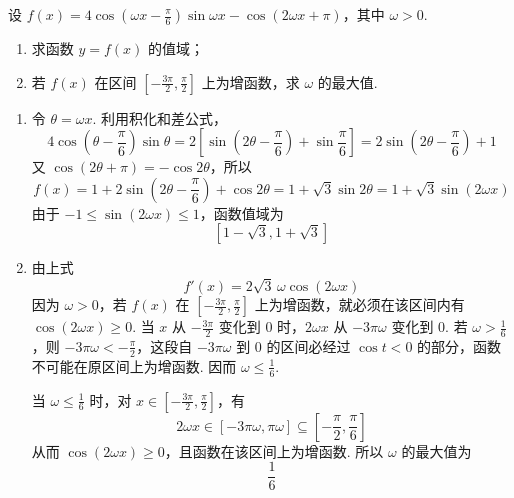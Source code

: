 \begin{problem}
设 \( f(x)=4\cos\left(\omega x-\frac{\pi}{6}\right)\sin\omega x-\cos(2\omega x+\pi) \)，其中 \( \omega>0 \).
\begin{enumerate}
\item 求函数 \( y = f(x) \) 的值域；
\item 若 \( f(x) \) 在区间 \( \left[-\frac{3\pi}{2}, \frac{\pi}{2}\right] \) 上为增函数，求 \( \omega \) 的最大值.
\end{enumerate}
\begin{solution}
\begin{enumerate}
\item 令 \(\theta=\omega x\). 利用积化和差公式，
\[
4\cos\left(\theta-\frac\pi6\right)\sin\theta
=2\left[\sin\left(2\theta-\frac\pi6\right)+\sin\frac\pi6\right]
=2\sin\left(2\theta-\frac\pi6\right)+1
\]
又 \(\cos(2\theta+\pi)=-\cos2\theta\)，所以
\[
f(x)=1+2\sin\left(2\theta-\frac\pi6\right)+\cos2\theta
=1+\sqrt3\sin2\theta
=1+\sqrt3\sin(2\omega x)
\]
由于 \(-1\le\sin(2\omega x)\le1\)，函数值域为
\[
\left[1-\sqrt3,1+\sqrt3\right]
\]

\item 由上式
\[
f'(x)=2\sqrt3\,\omega\cos(2\omega x)
\]
因为 \(\omega>0\)，若 \(f(x)\) 在 \(\left[-\frac{3\pi}{2},\frac\pi2\right]\) 上为增函数，就必须在该区间内有 \(\cos(2\omega x)\ge0\). 当 \(x\) 从 \(-\frac{3\pi}{2}\) 变化到 \(0\) 时，\(2\omega x\) 从 \(-3\pi\omega\) 变化到 \(0\). 若 \(\omega>\frac16\)，则 \(-3\pi\omega<-\frac\pi2\)，这段自 \(-3\pi\omega\) 到 \(0\) 的区间必经过 \(\cos t<0\) 的部分，函数不可能在原区间上为增函数. 因而 \(\omega\le\frac16\).

当 \(\omega\le\frac16\) 时，对 \(x\in\left[-\frac{3\pi}{2},\frac\pi2\right]\)，有
\[
2\omega x\in\left[-3\pi\omega,\pi\omega\right]
\subseteq\left[-\frac\pi2,\frac\pi6\right]
\]
从而 \(\cos(2\omega x)\ge0\)，且函数在该区间上为增函数. 所以 \(\omega\) 的最大值为
\[
\frac16
\]
\end{enumerate}
\end{solution}
\end{problem}

